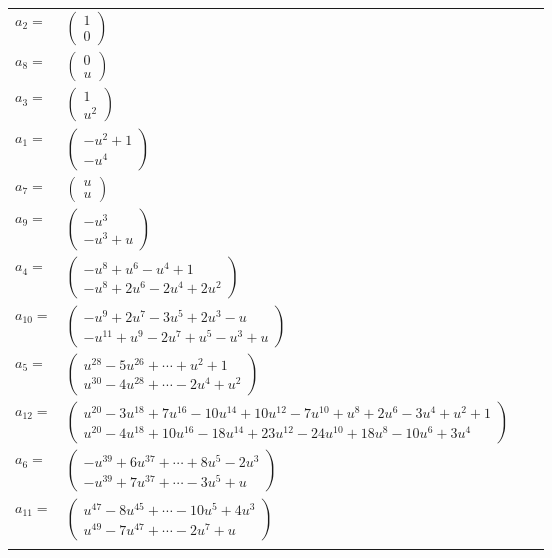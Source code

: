 \documentclass[1p]{elsarticle_modified}
\theoremstyle{definition}
\begin{document}
\begin{tabular}{m{7pt} m{180pt} m{7pt} m{180pt} }
\flushright $a_{2}=$&$\begin{pmatrix}1\\0\end{pmatrix}$ \\
\flushright $a_{8}=$&$\begin{pmatrix}0\\u\end{pmatrix}$ \\
\flushright $a_{3}=$&$\begin{pmatrix}1\\u^2\end{pmatrix}$ \\
\flushright $a_{1}=$&$\begin{pmatrix}- u^2+1\\- u^4\end{pmatrix}$ \\
\flushright $a_{7}=$&$\begin{pmatrix}u\\u\end{pmatrix}$ \\
\flushright $a_{9}=$&$\begin{pmatrix}- u^3\\- u^3+u\end{pmatrix}$ \\
\flushright $a_{4}=$&$\begin{pmatrix}- u^8+u^6- u^4+1\\- u^8+2 u^6-2 u^4+2 u^2\end{pmatrix}$ \\
\flushright $a_{10}=$&$\begin{pmatrix}- u^9+2 u^7-3 u^5+2 u^3- u\\- u^{11}+u^9-2 u^7+u^5- u^3+u\end{pmatrix}$ \\
\flushright $a_{5}=$&$\begin{pmatrix}u^{28}-5 u^{26}+\cdots+u^2+1\\u^{30}-4 u^{28}+\cdots-2 u^4+u^2\end{pmatrix}$ \\
\flushright $a_{12}=$&$\begin{pmatrix}u^{20}-3 u^{18}+7 u^{16}-10 u^{14}+10 u^{12}-7 u^{10}+u^8+2 u^6-3 u^4+u^2+1\\u^{20}-4 u^{18}+10 u^{16}-18 u^{14}+23 u^{12}-24 u^{10}+18 u^8-10 u^6+3 u^4\end{pmatrix}$ \\
\flushright $a_{6}=$&$\begin{pmatrix}- u^{39}+6 u^{37}+\cdots+8 u^5-2 u^3\\- u^{39}+7 u^{37}+\cdots-3 u^5+u\end{pmatrix}$ \\
\flushright $a_{11}=$&$\begin{pmatrix}u^{47}-8 u^{45}+\cdots-10 u^5+4 u^3\\u^{49}-7 u^{47}+\cdots-2 u^7+u\end{pmatrix}$\\&\end{tabular}
\end{document}
